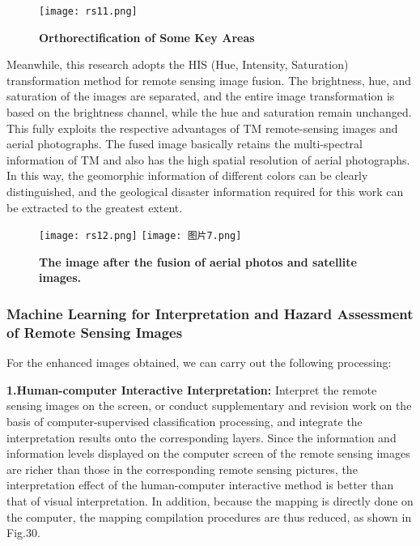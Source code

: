 \documentclass[conference]{IEEEtran}
\begin{document}
\begin{figure}[h]
    \centering
    \texttt{[image: rs11.png]}
    \caption{\textbf{Orthorectification of Some Key Areas}}
    \label{fig:enter-label}
\end{figure}

Meanwhile, this research adopts the HIS (Hue, Intensity, Saturation) transformation method for remote sensing image fusion. The brightness, hue, and saturation of the images are separated, and the entire image transformation is based on the brightness channel, while the hue and saturation remain unchanged. This fully exploits the respective advantages of TM remote-sensing images and aerial photographs\cite{b75}. The fused image basically retains the multi-spectral information of TM and also has the high spatial resolution of aerial photographs. In this way, the geomorphic information of different colors can be clearly distinguished, and the geological disaster information required for this work can be extracted to the greatest extent.

\begin{figure}[h]
    \centering
    \texttt{[image: rs12.png]}
    \quad
    \texttt{[image: 图片7.png]}
    \caption{\textbf{The image after the fusion of aerial photos and satellite images.}}
    \label{fig:enter-label}
\end{figure}

\subsubsection{Machine Learning for Interpretation and Hazard Assessment of Remote Sensing Images}
For the enhanced images obtained, we can carry out the following processing:

\textbf{1.Human-computer Interactive Interpretation:} Interpret the remote sensing images on the screen, or conduct supplementary and revision work on the basis of computer-supervised classification processing, and integrate the interpretation results onto the corresponding layers. Since the information and information levels displayed on the computer screen of the remote sensing images are richer than those in the corresponding remote sensing pictures, the interpretation effect of the human-computer interactive method is better than that of visual interpretation. In addition, because the mapping is directly done on the computer, the mapping compilation procedures are thus reduced\cite{b76}, as shown in Fig.30.
\end{document}
